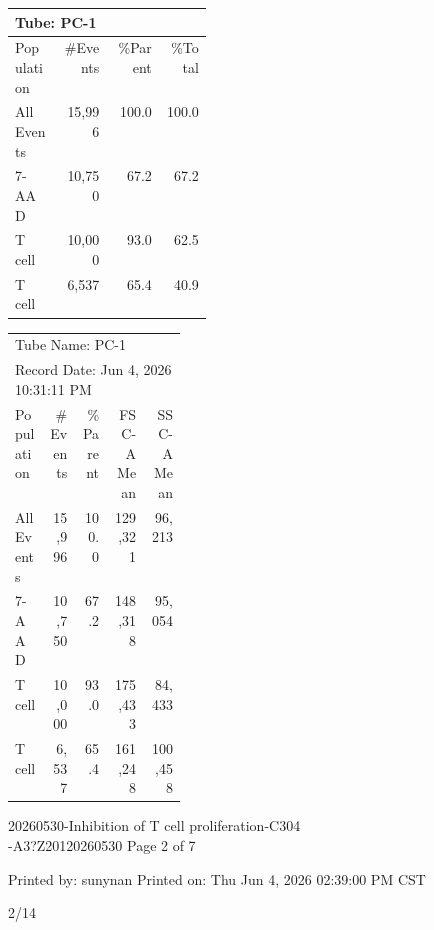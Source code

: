 \documentclass[UTF8,10pt,a4paper,fontset=fandol]{ctexart}
\newcommand{\handwritten}[1]{#1}
\begin{document}
\begin{center}
\end{center}

\begin{center}
\small
\begin{tabular}{|p{0.23\linewidth}|r|r|r|}
\hline
\multicolumn{4}{|l|}{Tube: PC-1}\\
\hline
Population & \#Events & \%Parent & \%Total\\
\hline
All Events & 15,996 & 100.0 & 100.0\\
7-AAD & 10,750 & 67.2 & 67.2\\
T cell & 10,000 & 93.0 & 62.5\\
T cell & 6,537 & 65.4 & 40.9\\
\hline
\end{tabular}
\end{center}

\begin{center}
\small
\begin{tabular}{|p{0.20\linewidth}|r|r|r|r|}
\hline
\multicolumn{5}{|l|}{Tube Name: PC-1}\\
\multicolumn{5}{|l|}{Record Date: Jun 4, 2026 10:31:11 PM}\\
\hline
Population & \#Events & \%Parent & FSC-A Mean & SSC-A Mean\\
\hline
All Events & 15,996 & 100.0 & 129,321 & 96,213\\
7-AAD & 10,750 & 67.2 & 148,318 & 95,054\\
T cell & 10,000 & 93.0 & 175,433 & 84,433\\
T cell & 6,537 & 65.4 & 161,248 & 100,458\\
\hline
\end{tabular}
\end{center}

\vfill

\noindent
\scriptsize
20260530-Inhibition of T cell proliferation-C304\\
-A3?Z20120260530
\hfill Page 2 of 7

\noindent
Printed by: sunynan
\hfill Printed on: Thu Jun 4, 2026 02:39:00 PM CST

\begin{flushright}
\handwritten{2/14}
\end{flushright}
\end{document}
